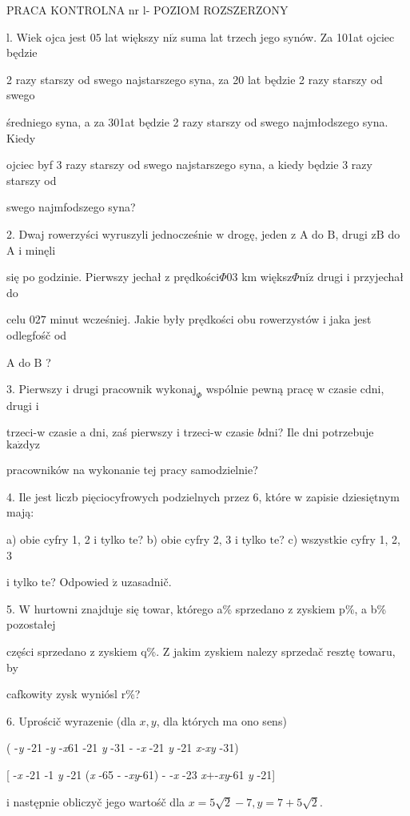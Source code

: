 \documentclass[a4paper,12pt]{article}
\begin{document}
PRACA KONTROLNA nr l- POZIOM ROZSZERZONY

l. Wiek ojca jest $05$ lat większy $\mathrm{n}\mathrm{i}\dot{\mathrm{z}}$ suma lat trzech jego synów. Za 101at ojciec będzie

2 razy starszy od swego najstarszego syna, za 20 lat będzie 2 razy starszy od swego

średniego syna, a za 301at będzie 2 razy starszy od swego najmłodszego syna. Kiedy

ojciec byf 3 razy starszy od swego najstarszego syna, a kiedy będzie 3 razy starszy od

swego najmfodszego syna?

2. Dwaj rowerzyści wyruszyli jednocześnie $\mathrm{w}$ drogę, jeden $\mathrm{z}$ A do $\mathrm{B}$, drugi $\mathrm{z}\mathrm{B}$ do A $\mathrm{i}$ minęli

się po godzinie. Pierwszy jechał $\mathrm{z}$ prędkości$\Phi 03$ km większ$\Phi \mathrm{n}\mathrm{i}\dot{\mathrm{z}}$ drugi $\mathrm{i}$ przyjechał do

celu $027$ minut wcześniej. Jakie były prędkości obu rowerzystów $\mathrm{i}$ jaka jest odlegfośč od

A do $\mathrm{B}$ ?

3. Pierwszy $\mathrm{i}$ drugi pracownik $\mathrm{w}\mathrm{y}\mathrm{k}\mathrm{o}\mathrm{n}\mathrm{a}\mathrm{j}_{\Phi}$ wspólnie pewną pracę $\mathrm{w}$ czasie $\mathrm{c} \mathrm{d}\mathrm{n}\mathrm{i}$, drugi $\mathrm{i}$

trzeci-w czasie a $\mathrm{d}\mathrm{n}\mathrm{i}$, zaś pierwszy $\mathrm{i}$ trzeci-w czasie $b\mathrm{d}\mathrm{n}\mathrm{i}$? Ile dni potrzebuje $\mathrm{k}\mathrm{a}\dot{\mathrm{z}}\mathrm{d}\mathrm{y}\mathrm{z}$

pracowników na wykonanie tej pracy samodzielnie?

4. Ile jest liczb pięciocyfrowych podzielnych przez 6, które $\mathrm{w}$ zapisie dziesiętnym mają:

a) obie cyfry 1, 2 $\mathrm{i}$ tylko $\mathrm{t}\mathrm{e}$? b) obie cyfry 2, 3 $\mathrm{i}$ tylko $\mathrm{t}\mathrm{e}$? c) wszystkie cyfry 1, 2, 3

$\mathrm{i}$ tylko $\mathrm{t}\mathrm{e}$? Odpowied $\acute{\mathrm{z}}$ uzasadnič.

5. $\mathrm{W}$ hurtowni znajduje się towar, którego a\% sprzedano $\mathrm{z}$ zyskiem p\%, a b\% pozostałej

części sprzedano $\mathrm{z}$ zyskiem q\%. $\mathrm{Z}$ jakim zyskiem nalezy sprzedač resztę towaru, by

cafkowity zysk wyniósl r\%?

6. Uprościč wyrazenie (dla $x, y$, dla których ma ono sens)

( -{\it y} -21 -{\it y} -{\it x}61 -21 {\it y} -31 - -{\it x} -21 {\it y} -21 {\it x-xy} -31)

[ -{\it x} -21 -1 {\it y} -21 ({\it x} -65 - -{\it xy}-61) - -{\it x} -23 {\it x}$+$-{\it xy}-61 {\it y} -21]

$\mathrm{i}$ następnie obliczyč jego wartośč dla $x=5\sqrt{2}-7, y=7+5\sqrt{2}.$
\end{document}
